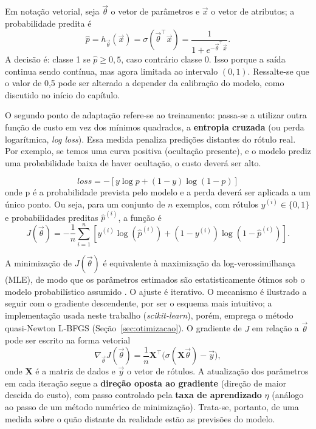 Em notação vetorial, seja \(\vec{\theta}\) o vetor de parâmetros  e \(\vec{x}\) o vetor de atributos; a probabilidade predita é
\[
\hat{p} = h_{\vec{\theta}}(\vec{x}) = \sigma(\vec{\theta}^\top \vec{x}) = \frac{1}{1 + e^{-\vec{\theta}^\top \vec{x}}}.
\]
A decisão é: classe 1 se \(\hat{p} \geq 0{,}5\), caso contrário classe 0. Isso porque a saída continua sendo contínua, mas agora limitada ao intervalo $(0,1)$. Ressalte-se que o valor de 0,5 pode ser alterado a depender da calibração do modelo, como discutido no início do capítulo. 

O segundo ponto de adaptação refere-se ao treinamento: passa-se a utilizar outra função de custo em vez dos mínimos quadrados, a \textbf{entropia cruzada} (ou perda logarítmica, \textit{log loss}). Essa medida penaliza predições distantes do rótulo real. Por exemplo, se temos uma curva positiva (ocultação presente), e o modelo prediz uma probabilidade baixa de haver ocultação, o custo deverá ser alto. 

\[
loss = - [y \log{p} + (1-y) \log{(1-p)}]
\] onde p é a probabilidade prevista pelo modelo e a perda deverá ser aplicada a um único ponto. Ou seja, para um conjunto de \(n\) exemplos, com rótulos \(y^{(i)} \in \{0,1\}\) e probabilidades preditas \(\hat{p}^{(i)}\), a função é
\begin{equation}
J(\vec{\theta}) = -\frac{1}{n} \sum_{i=1}^{n} \left[ y^{(i)} \log(\hat{p}^{(i)}) + (1 - y^{(i)}) \log(1 - \hat{p}^{(i)}) \right].
\end{equation}


A minimização de \(J(\vec{\theta})\) é equivalente à maximização da log-verossimilhança (MLE), de modo que os parâmetros estimados são estatisticamente ótimos sob o modelo probabilístico assumido \citep{geron2019maos, Levada2026}. O ajuste é iterativo. O mecanismo é ilustrado a seguir com o gradiente descendente, por ser o esquema mais intuitivo; a implementação usada neste trabalho (\textit{scikit-learn}), porém, emprega o método quasi-Newton L-BFGS (Seção~\ref{sec:otimizacao}). O gradiente de \(J\) em relação a \(\vec{\theta}\) pode ser escrito na forma vetorial
\[
\nabla_{\vec{\theta}} J(\vec{\theta}) = \frac{1}{n} \mathbf{X}^\top \big( \sigma(\mathbf{X}\vec{\theta}) - \vec{y} \big),
\]
onde \(\mathbf{X}\) é a matriz de dados e \(\vec{y}\) o vetor de rótulos. A atualização dos parâmetros em cada iteração segue a \textbf{direção oposta ao gradiente} (direção de maior descida do custo), com passo controlado pela \textbf{taxa de aprendizado} \(\eta\) (análogo ao passo de um método numérico de minimização). Trata-se, portanto, de uma medida sobre o quão distante da realidade estão as previsões do modelo.

